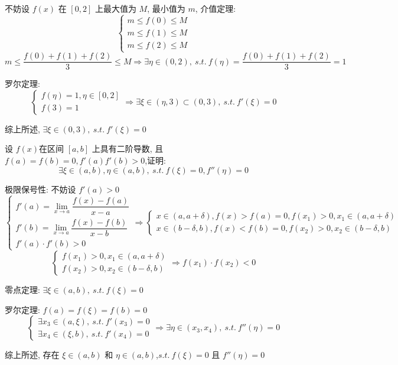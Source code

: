 \begin{solution}

	不妨设 $f(x)$ 在 $[0,2]$ 上最大值为 $M$, 最小值为 $m$, 介值定理:
	$$\begin{cases}
		m\leq f(0)\leq M\\
		m\leq f(1)\leq M\\
		m\leq f(2)\leq M
	\end{cases}$$
	$$m\leq \dfrac{f(0)+f(1)+f(2)}{3}\leq M
	\Rightarrow \exists \eta\in(0,2),\ s.t.\ f(\eta) = \dfrac{f(0)+f(1)+f(2)}{3}=1$$

	罗尔定理:
	$$\begin{cases} 
		f(\eta) = 1,\eta\in[0,2]\\
		f(3) =1
	\end{cases}\Rightarrow \exists \xi\in(\eta,3)\subset (0,3),\ s.t.\ f'(\xi) = 0$$

	综上所述, $\exists \xi\in(0,3),\ s.t.\ f'(\xi)=0$
\end{solution}

\begin{example}[][Exam: 28.1.14]
	设 $f(x)$在区间 $[a,b]$ 上具有二阶导数, 且 $f(a)=f(b)=0,f'(a)f'(b)>0$,证明:
	$$\exists \xi\in(a,b), \eta\in(a,b),\ s.t.\ f(\xi) = 0, f''(\eta) = 0$$
\end{example}

\begin{solution}

	极限保号性: 不妨设 $f'(a) > 0$
	$$\begin{cases}
	f'(a) = \lim\limits_{x\to a} \dfrac{f(x)-f(a)}{x-a}\\
	f'(b) = \lim\limits_{x\to a} \dfrac{f(x)-f(b)}{x-b}\\
	f'(a)\cdot f'(b) > 0
	\end{cases}\Rightarrow 
	\begin{cases}
	x\in(a,a+\delta), f(x) > f(a) =0, f(x_{1}) > 0, x_{1}\in(a,a+\delta)\\
	x\in(b-\delta,b), f(x) < f(b) =0, f(x_{2}) > 0, x_{2}\in(b-\delta,b)
	\end{cases}$$
	$$\begin{cases}
	f(x_{1}) > 0, x_{1}\in(a,a+\delta)\\
	f(x_{2}) > 0, x_{2}\in(b-\delta,b)
	\end{cases}\Rightarrow f(x_{1})\cdot f(x_{2}) < 0$$

	零点定理: $\exists \xi\in(a,b),\ s.t.\ f(\xi) = 0$

	罗尔定理: $f(a) = f(\xi) =f(b) =0$
	$$\begin{cases}
	\exists x_{3}\in (a,\xi),\ s.t.\ f'(x_{3}) = 0\\
	\exists x_{4}\in (\xi,b),\ s.t.\ f'(x_{4}) = 0
	\end{cases}\Rightarrow \exists \eta\in (x_{3},x_{4}),\ s.t.\ f''(\eta) = 0$$

	综上所述, 存在 $\xi\in(a,b)$ 和 $\eta\in(a,b)$,$s.t.\ f(\xi)=0$ 且 $f''(\eta)=0$
\end{solution}

